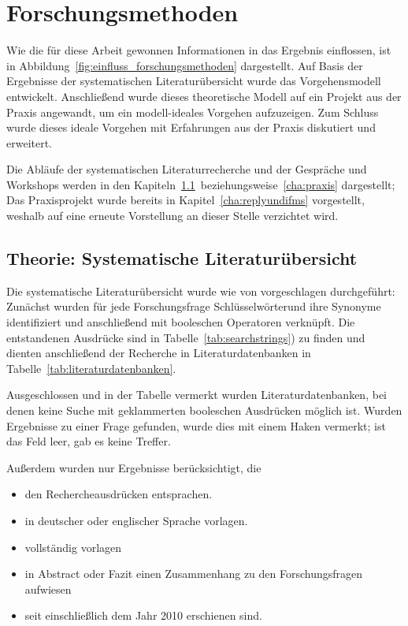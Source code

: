 \section{Forschungsmethoden}
\label{cha:method}
Wie die für diese Arbeit gewonnen Informationen in das Ergebnis einflossen, ist 
in Abbildung~\ref{fig:einfluss_forschungsmethoden} dargestellt. Auf Basis der 
Ergebnisse der systematischen Literaturübersicht wurde das Vorgehensmodell 
entwickelt. Anschließend wurde dieses theoretische Modell auf ein Projekt aus 
der Praxis angewandt, um ein modell-ideales Vorgehen aufzuzeigen. Zum Schluss 
wurde dieses ideale Vorgehen mit Erfahrungen aus der Praxis diskutiert und 
erweitert.

Die Abläufe der systematischen Literaturrecherche und der Gespräche und 
Workshops werden in den 
Kapiteln~\ref{cha:literaturuebersicht}~beziehungsweise~\ref{cha:praxis} 
dargestellt; Das Praxisprojekt wurde bereits in Kapitel~\ref{cha:replyundifms} 
vorgestellt, weshalb auf eine erneute Vorstellung an dieser Stelle verzichtet 
wird.
\subsection{Theorie: Systematische Literaturübersicht}
\label{cha:literaturuebersicht}
Die systematische Literaturübersicht wurde wie von  
vorgeschlagen durchgeführt: Zunächst wurden für jede Forschungsfrage 
Schlüsselwörterund ihre Synonyme identifiziert und anschließend mit booleschen 
Operatoren verknüpft. Die entstandenen Ausdrücke sind in 
Tabelle~\ref{tab:searchstrings}) zu finden und dienten anschließend der 
Recherche in Literaturdatenbanken in Tabelle~\ref{tab:literaturdatenbanken}.


Ausgeschlossen und in der Tabelle vermerkt wurden Literaturdatenbanken, bei 
denen keine Suche mit geklammerten booleschen Ausdrücken möglich ist. Wurden 
Ergebnisse zu einer Frage gefunden, wurde dies mit einem Haken vermerkt; ist 
das Feld leer, gab es keine Treffer.

Außerdem wurden nur Ergebnisse berücksichtigt, die
\begin{itemize}
	\item den Rechercheausdrücken entsprachen.
	\item in deutscher oder englischer Sprache vorlagen.
	\item vollständig vorlagen
	\item in Abstract oder Fazit einen Zusammenhang zu den Forschungsfragen
aufwiesen
	\item seit einschließlich dem Jahr 2010 erschienen sind.
\end{itemize}

\begin{comment}
In diesem Kapitel erläutern Sie ihre Forschungsmethode unter Verwendung von
entsprechenden Quellen.
Begründen Sie auch, warum Sie sich für diese Forschungsmethode entschieden
haben
und warum sie geeignet ist, die vorliegende Forschungsfrage zu beantworten.
\end{comment}
